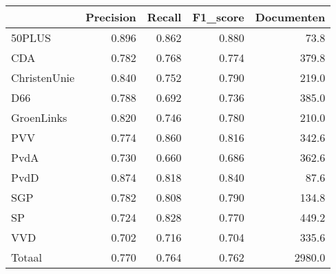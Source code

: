 \begin{tabular}{lrrrr}
\toprule
{} &  Precision &  Recall &  F1\_score &  Documenten \\
\midrule
50PLUS       &      0.896 &   0.862 &     0.880 &        73.8 \\
   CDA       &      0.782 &   0.768 &     0.774 &       379.8 \\
ChristenUnie &      0.840 &   0.752 &     0.790 &       219.0 \\
   D66       &      0.788 &   0.692 &     0.736 &       385.0 \\
  GroenLinks &      0.820 &   0.746 &     0.780 &       210.0 \\
   PVV       &      0.774 &   0.860 &     0.816 &       342.6 \\
  PvdA       &      0.730 &   0.660 &     0.686 &       362.6 \\
  PvdD       &      0.874 &   0.818 &     0.840 &        87.6 \\
   SGP       &      0.782 &   0.808 &     0.790 &       134.8 \\
    SP       &      0.724 &   0.828 &     0.770 &       449.2 \\
   VVD       &      0.702 &   0.716 &     0.704 &       335.6 \\
Totaal       &      0.770 &   0.764 &     0.762 &      2980.0 \\
\bottomrule
\end{tabular}
